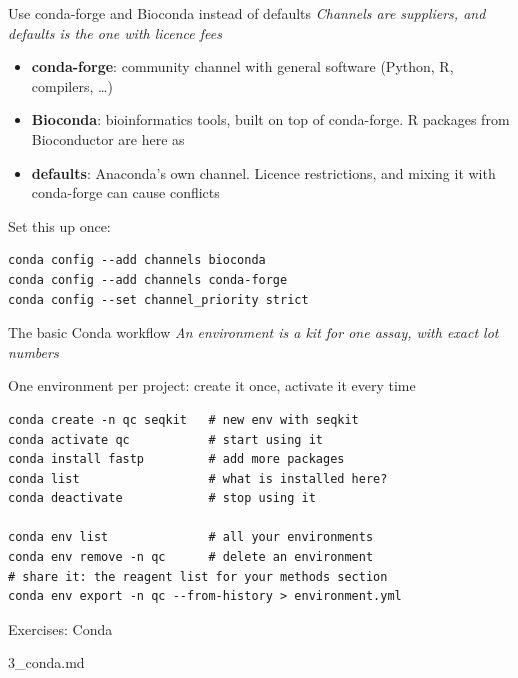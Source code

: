 \begin{frame}[fragile]{Use conda-forge and Bioconda instead of defaults}
\small
\emph{Channels are suppliers, and defaults is the one with licence fees}
\begin{itemize}
    \item \textbf{conda-forge}: community channel with general software (Python, R, compilers, \ldots)
    \item \textbf{Bioconda}: bioinformatics tools, built on top of conda-forge.
          R packages from Bioconductor are here as 
    \item \textbf{defaults}: Anaconda's own channel.
          Licence restrictions, and mixing it with conda-forge can cause conflicts
\end{itemize}
Set this up once:
\begin{lstlisting}
conda config --add channels bioconda
conda config --add channels conda-forge
conda config --set channel_priority strict
\end{lstlisting}
\end{frame}

\begin{frame}[fragile]{The basic Conda workflow}
\emph{An environment is a kit for one assay, with exact lot numbers}

\smallskip
One environment per project: create it once, activate it every time
\begin{lstlisting}
conda create -n qc seqkit   # new env with seqkit
conda activate qc           # start using it
conda install fastp         # add more packages
conda list                  # what is installed here?
conda deactivate            # stop using it

conda env list              # all your environments
conda env remove -n qc      # delete an environment
# share it: the reagent list for your methods section
conda env export -n qc --from-history > environment.yml
\end{lstlisting}
\end{frame}

\begin{frame}{Exercises: Conda}
\begin{exlist}{3_conda.md}
\end{exlist}
\end{frame}

